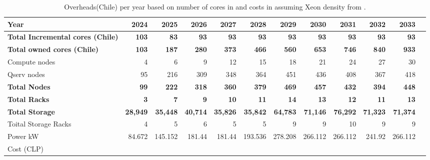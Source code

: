 \tiny \begin{longtable} { |p{}  |r  |r  |r  |r  |r  |r  |r  |r  |r  |r  |r |} 
\caption{Overheads(Chile) per year based on number of cores in  and costs in  assuming Xeon density from .  \label{tab:opsOverheadChile}}\\ 
\hline 
\textbf{Year}&\textbf{2024}&\textbf{2025}&\textbf{2026}&\textbf{2027}&\textbf{2028}&\textbf{2029}&\textbf{2030}&\textbf{2031}&\textbf{2032}&\textbf{2033} \\ \hline
\textbf{Total Incremental cores (Chile)}&\textbf{103}&\textbf{83}&\textbf{93}&\textbf{93}&\textbf{93}&\textbf{93}&\textbf{93}&\textbf{93}&\textbf{93}&\textbf{93} \\ \hline
\textbf{Total owned cores (Chile)}&\textbf{103}&\textbf{187}&\textbf{280}&\textbf{373}&\textbf{466}&\textbf{560}&\textbf{653}&\textbf{746}&\textbf{840}&\textbf{933} \\ \hline
{Compute nodes}&{4}&{6}&{9}&{12}&{15}&{18}&{21}&{24}&{27}&{30} \\ \hline
{Qserv nodes}&{95}&{216}&{309}&{348}&{364}&{451}&{436}&{408}&{367}&{418} \\ \hline
\textbf{Total Nodes}&\textbf{99}&\textbf{222}&\textbf{318}&\textbf{360}&\textbf{379}&\textbf{469}&\textbf{457}&\textbf{432}&\textbf{394}&\textbf{448} \\ \hline
\textbf{Total Racks}&\textbf{3}&\textbf{7}&\textbf{9}&\textbf{10}&\textbf{11}&\textbf{14}&\textbf{13}&\textbf{12}&\textbf{11}&\textbf{13} \\ \hline
\textbf{Total Storage}&\textbf{28,949}&\textbf{35,448}&\textbf{40,714}&\textbf{35,826}&\textbf{35,842}&\textbf{64,783}&\textbf{71,146}&\textbf{76,292}&\textbf{71,323}&\textbf{71,374} \\ \hline
{Toital Storage Racks}&{4}&{5}&{6}&{5}&{5}&{9}&{9}&{10}&{9}&{9} \\ \hline
{Power kW
}&{84.672}&{145.152}&{181.44}&{181.44}&{193.536}&{278.208}&{266.112}&{266.112}&{241.92}&{266.112} \\ \hline
{Cost (CLP)}&&&&&&&&&& \\ \hline
\end{longtable} \normalsize

